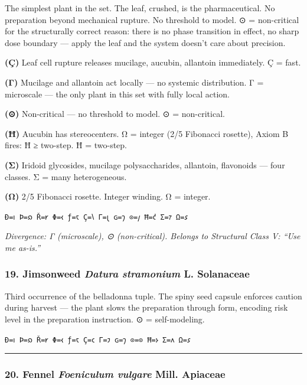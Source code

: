 \documentclass[12pt,a4paper]{article}
\begin{document}
The simplest plant in the set. The leaf, crushed, is the pharmaceutical.
No preparation beyond mechanical rupture. No threshold to model. ⊙ =
non-critical for the structurally correct reason: there is no phase
transition in effect, no sharp dose boundary --- apply the leaf and the
system doesn't care about precision.

\textbf{(Ç)} Leaf cell rupture releases mucilage, aucubin, allantoin
immediately. Ç = fast.

\textbf{(Γ)} Mucilage and allantoin act locally --- no systemic
distribution. Γ = microscale --- the only plant in this set with fully
local action.

\textbf{(⊙)} Non-critical --- no threshold to model. ⊙ = non-critical.

\textbf{(Ħ)} Aucubin has stereocenters. Ω = integer (2/5 Fibonacci
rosette), Axiom B fires: Ħ ≥ two-step. Ħ = two-step.

\textbf{(Σ)} Iridoid glycosides, mucilage polysaccharides, allantoin,
flavonoids --- four classes. Σ = many heterogeneous.

\textbf{(Ω)} 2/5 Fibonacci rosette. Integer winding. Ω = integer.

\texttt{Ð=𐑦\ Þ=𐑸\ Ř=𐑾\ Φ=𐑬\ ƒ=𐑱\ Ç=𐑘\ Γ=𐑚\ ɢ=𐑠\ ⊙=𐑢\ Ħ=𐑒\ Σ=𐑳\ Ω=𐑭}

\emph{Divergence: Γ (microscale), ⊙ (non-critical). Belongs to
Structural Class V: ``Use me as-is.''}

\hypertarget{jimsonweed-datura-stramonium-l.-solanaceae}{%
\subsubsection{\texorpdfstring{19. Jimsonweed \textbar{} \emph{Datura
stramonium} L. \textbar{}
Solanaceae}{19. Jimsonweed \textbar{} Datura stramonium L. \textbar{} Solanaceae}}\label{jimsonweed-datura-stramonium-l.-solanaceae}}

Third occurrence of the belladonna tuple. The spiny seed capsule
enforces caution during harvest --- the plant slows the preparation
through form, encoding risk level in the preparation instruction. ⊙ =
self-modeling.

\texttt{Ð=𐑦\ Þ=𐑸\ Ř=𐑾\ Φ=𐑬\ ƒ=𐑱\ Ç=𐑤\ Γ=𐑲\ ɢ=𐑠\ ⊙=⊙\ Ħ=𐑶\ Σ=𐑵\ Ω=𐑭}

\begin{center}\rule{0.5\linewidth}{0.5pt}\end{center}

\hypertarget{fennel-foeniculum-vulgare-mill.-apiaceae}{%
\subsubsection{\texorpdfstring{20. Fennel \textbar{} \emph{Foeniculum
vulgare} Mill. \textbar{}
Apiaceae}{20. Fennel \textbar{} Foeniculum vulgare Mill. \textbar{} Apiaceae}}\label{fennel-foeniculum-vulgare-mill.-apiaceae}}
\end{document}
